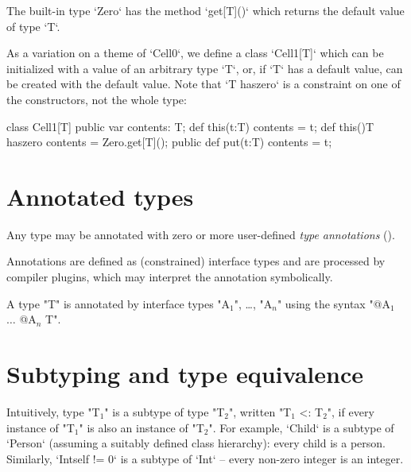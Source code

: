 The built-in type \xcd`Zero` has the method \xcd`get[T]()` which
returns the default value of type \xcd`T`.  

\begin{ex}
As a variation on a theme of \xcd`Cell0`, we define a class \xcd`Cell1[T]` which can be initialized with a value of an arbitrary
type
\xcd`T`, or, if \xcd`T` has a default value, can be created with the default
value.  Note that \xcd`T haszero` is a constraint on one of
the constructors, not the whole type:  
\begin{xten}
class Cell1[T] {
  public var contents: T;
  def this(t:T) { contents = t; }
  def this(){T haszero} { contents = Zero.get[T](); }
  public def put(t:T) {contents = t;}
}
\end{xten}
%

\end{ex}

\section{Annotated types}
\label{AnnotatedTypes}


        Any \Xten{} type may be annotated with zero or more
        user-defined \emph{type annotations}
        ().  

        Annotations are defined as (constrained) interface types and are
        processed by compiler plugins, which may interpret the
        annotation symbolically.

        A type \xcd"T" is annotated by interface types
        \xcdmath"A$_1$", \dots,
        \xcdmath"A$_n$"
        using the syntax
        \xcdmath"@A$_1$ $\dots$ @A$_n$ T".

\section{Subtyping and type equivalence}\label{DepType:Equivalence}

Intuitively, type \xcdmath"T$_1$" is a subtype of type \xcdmath"T$_2$", 
written \xcdmath"T$_1$ <: T$_2$", 
if
every instance of \xcdmath"T$_1$" is also an instance of \xcdmath"T$_2$".  For
example, \xcd`Child` is a subtype of \xcd`Person` (assuming a suitably defined
class hierarchy): every child is a person.  Similarly, \xcd`Int{self != 0}`
is a subtype of \xcd`Int` -- every non-zero integer is an integer.  

